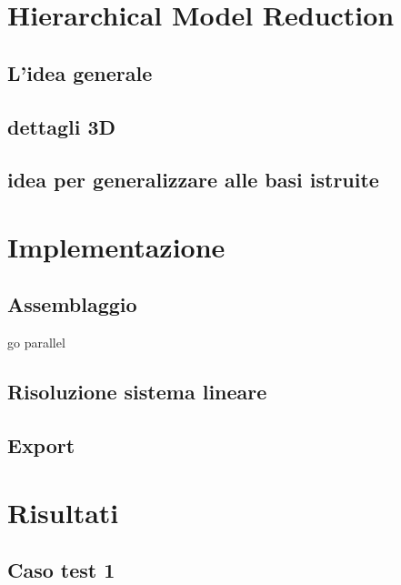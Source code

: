 \section{Hierarchical Model Reduction}
\subsection{L'idea generale}
\subsection{dettagli 3D}
\subsection{idea per generalizzare alle basi istruite}
\section{Implementazione}
\subsection{Assemblaggio}
go parallel
\subsection{Risoluzione sistema lineare}
\subsection{Export}
\section{Risultati}
\subsection{Caso test 1}

